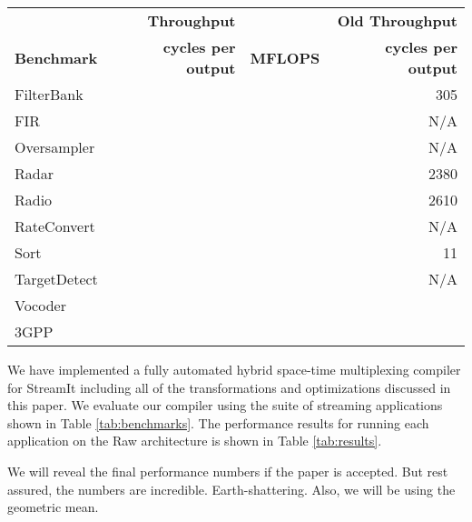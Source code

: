 \begin{table*}[t]
\begin{center}
\scriptsize
\begin{tabular}{|l||r|r||r||}\hline
& {\bf Throughput} &  & {\bf Old Throughput}\\
{\bf Benchmark} &  {\bf cycles per output} & {\bf MFLOPS} &  {\bf cycles per output}\\ 
\hline \hline
FilterBank & & & 305 \\ \hline
FIR & & & N/A\\ \hline
Oversampler & & & N/A \\ \hline
Radar & & & 2380 \\ \hline
Radio & & & 2610 \\ \hline
RateConvert & & & N/A\\ \hline
Sort & & & 11 \\ \hline
TargetDetect & & & N/A\\ \hline
Vocoder & & & \\ \hline
3GPP& & & \\ \hline
\hline
\end{tabular}
\caption{\protect\small Performance Results.}
\label{tab:results}
\end{center}
\end{table*}

We have implemented a fully automated hybrid space-time multiplexing
compiler for StreamIt including all of the transformations and
optimizations discussed in this paper.  We evaluate our compiler using
the suite of streaming applications shown in Table
\ref{tab:benchmarks}.  The performance results for running each
application on the Raw architecture is shown in Table
\ref{tab:results}.

We will reveal the final performance numbers if the paper is
accepted.  But rest assured, the numbers are incredible.
Earth-shattering. Also, we will be using the geometric mean.
